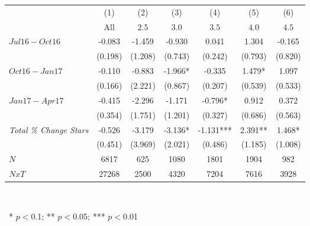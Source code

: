 \begin{center}
\begin{tabular}{lcccccc}
\hline  & (1) & (2) & (3) & (4) & (5) & (6)\\
 & All &  $ 2.5 $  &  $ 3.0 $  &  $ 3.5 $  &  $ 4.0 $  &  $ 4.5$ \\
\hline  $ Jul16-Oct16 $  & -0.083 & -1.459 & -0.930 & 0.041 & 1.304 & -0.165\\
 & (0.198) & (1.208) & (0.743) & (0.242) & (0.793) & (0.820)\\
 $ Oct16-Jan17 $  & -0.110 & -0.883 & -1.966* & -0.335 & 1.479* & 1.097\\
 & (0.166) & (2.221) & (0.867) & (0.207) & (0.539) & (0.533)\\
 $ Jan17-Apr17 $  & -0.415 & -2.296 & -1.171 & -0.796* & 0.912 & 0.372\\
 & (0.354) & (1.751) & (1.201) & (0.327) & (0.686) & (0.563)\\
\hline \textit{Total \% Change Stars} & -0.526 & -3.179 & -3.136* & -1.131*** & 2.391** & 1.468*\\
  & (0.451) & (3.969) & (2.021) & (0.486) & (1.185) & (1.008)\\
\hline  $ N $  & 6817 & 625 & 1080 & 1801 & 1904 & 982\\
 $ NxT $  & 27268 & 2500 & 4320 & 7204 & 7616 & 3928\\
\hline\end{tabular}\\
\begin{tiny}\ * $p<0$.1; ** $p<0$.05; *** $p<0$.01\end{tiny}\\
\end{center}
